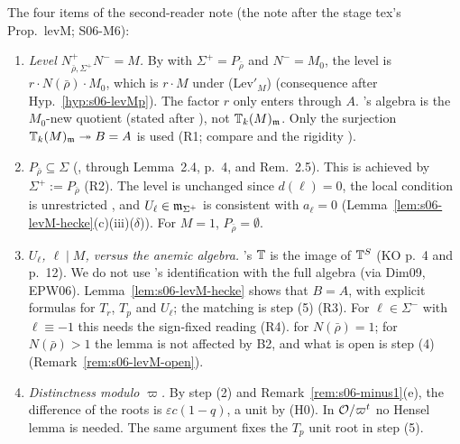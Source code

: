 \begin{remark}\label{rem:s06-levM-items}
The four items of the second-reader note (the note after the stage tex's Prop.~levM; S06-M6):
\begin{enumerate}[label=(\arabic*)]
\item \emph{Level $N^+_{\bar\rho,\Sigma^+}N^-=M$.} By \cite[(2.4), p.~7]{KO} with $\Sigma^+=P_{\bar\rho}$ and $N^-=M_0$, the level is
  $r\cdot N(\bar\rho)\cdot M_0$, which is $r\cdot M$ under (Lev$'_M$) (consequence after Hyp.~\ref{hyp:s06-levMp}). The factor $r$ only
  enters through $A$. \cite{KO}'s algebra is the $M_0$-new quotient (stated after \cite[Thm~3.14, p.~12]{KO}), not $\mathbb{T}_k(M)_{\mathfrak{m}}$. Only the
  surjection $\mathbb{T}_k(M)_{\mathfrak{m}}\twoheadrightarrow B=A$ is used (R1; compare \cite[Lemma~2.7, p.~5]{KO} and the rigidity \cite[Rem.~2.14(2), p.~7]{KO}).
  \stpmc
\item \emph{$P_{\bar\rho}\subseteq\Sigma$} (\cite[Thm~3.14, p.~12]{KO}, through Lemma~2.4, p.~4, and Rem.~2.5). This is achieved by
  $\Sigma^+:=P_{\bar\rho}$ (R2). The level is unchanged since $d(\ell)=0$, the local condition is unrestricted \cite[Def.~3.9(3), p.~11]{KO}, and
  $U_\ell\in\mathfrak{m}_{\Sigma^+}$ is consistent with $a_\ell=0$ (Lemma~\ref{lem:s06-levM-hecke}(c)(iii)($\delta$)). For $M=1$, $P_{\bar\rho}=\emptyset$. \stproved
\item \emph{$U_\ell$, $\ell\mid M$, versus the anemic algebra.} \cite{KO}'s $\mathbb{T}$ is the image of $\mathbb{T}^S$ (KO p.~4 and p.~12). We do not use
  \cite{KO}'s identification with the full algebra (via Dim09, EPW06). Lemma~\ref{lem:s06-levM-hecke} shows that $B=A$, with explicit
  formulas for $T_r$, $T_p$ and $U_\ell$; the matching is step (5) (R3). For $\ell\in\Sigma^-$ with $\ell\equiv-1$ this needs the sign-fixed
  reading (R4). \stpmc{} for $N(\bar\rho)=1$; for $N(\bar\rho)>1$ the lemma is not affected by B2, and what is open is step (4)
  (Remark~\ref{rem:s06-levM-open}).
\item \emph{Distinctness modulo $\varpi$.} By step (2) and Remark~\ref{rem:s06-minus1}(e), the difference of the roots is
  $\varepsilon c(1-q)$, a unit by (H0). In $\mathcal{O}/\varpi^t$ no Hensel lemma is needed. The same argument fixes the $T_p$ unit root in step (5).
  \stproved
\end{enumerate}
\end{remark}

